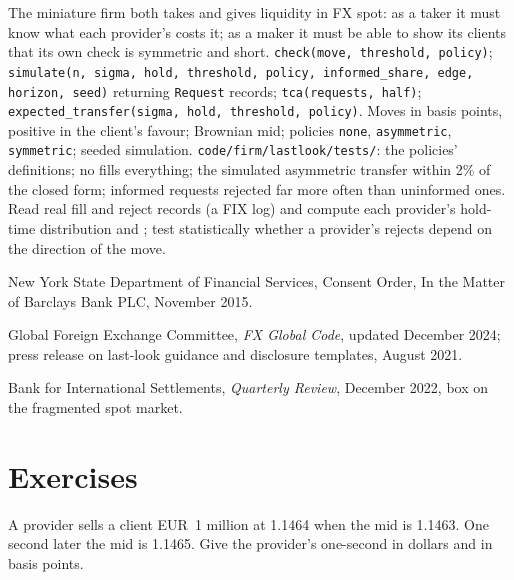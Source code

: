 \begin{build}
 The miniature firm both takes and gives liquidity in FX spot:
as a taker it must know what each provider's  costs it; as a maker it
must be able to show its clients that its own check is symmetric and short.
 \texttt{check(move, threshold, policy)};
\texttt{simulate(n, sigma, hold, threshold, policy, informed\_share, edge,
horizon, seed)} returning \texttt{Request} records; \texttt{tca(requests,
half)}; \texttt{expected\_transfer(sigma, hold, threshold, policy)}.
 Moves in basis points, positive in the client's favour;
Brownian mid; policies \texttt{none}, \texttt{asymmetric}, \texttt{symmetric};
seeded simulation.
 \texttt{code/firm/lastlook/tests/}: the policies'
definitions; no  fills everything; the simulated asymmetric transfer
within 2\% of the closed form; informed requests rejected far more often than
uninformed ones.
 Read real fill and reject records (a FIX log) and compute each
provider's hold-time distribution and ; test statistically whether a
provider's rejects depend on the direction of the move.
\end{build}

\begin{omsources}
\item New York State Department of Financial Services, Consent Order, In the
Matter of Barclays Bank PLC, November 2015.
\item Global Foreign Exchange Committee, \emph{FX Global Code}, updated
December 2024; press release on last-look guidance and disclosure templates,
August 2021.
\item Bank for International Settlements, \emph{Quarterly Review}, December
2022, box on the fragmented spot market.
\end{omsources}

\section{Exercises}

\begin{exercise}[$\star$]\label{exo:m2:fx-spot-microstructure:1}
A provider sells a client EUR~1 million at 1.1464 when the mid is 1.1463. One
second later the mid is 1.1465. Give the provider's one-second  in
dollars and in basis points.
\end{exercise}

